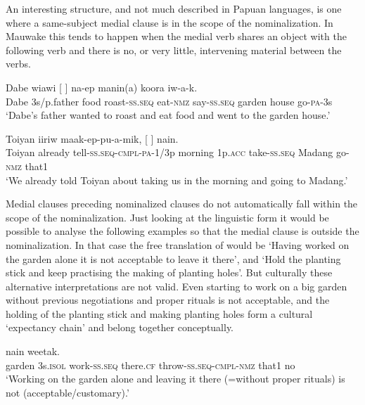 An interesting structure, and not much described in Papuan languages, is one where a same-subject medial clause is in the scope of the nominalization. In Mauwake this tends to happen when the medial verb shares an object with the following verb and there is no, or very little, intervening material between the verbs. 

\ea%
\label{ex:5:x1885}
\gll Dabe  wiawi  [  ]  na-ep manin(a)  koora  iw-a-k. \\
     Dabe  3s/p.father  food  roast-\textsc{ss}.\textsc{seq}  eat-\textsc{nmz}  say-\textsc{ss}.\textsc{seq} garden  house  go-\textsc{pa}-3s \\
\glt `Dabe's father wanted to roast and eat food and went to the garden house.'
\z

\ea%
\label{ex:5:x1845}
\gll Toiyan  iiriw  maak-ep-pu-a-mik,  [     ]  nain. \\
     Toiyan  already  tell-\textsc{ss}.\textsc{seq}-\textsc{cmpl}-\textsc{pa}-1/3p  morning  1p.\textsc{acc} take-\textsc{ss}.\textsc{seq}  Madang  go-\textsc{nmz}  that1 \\
\glt `We already told Toiyan about taking us in the morning and going to Madang.'
\z

Medial clauses preceding nominalized clauses do not automatically fall within the scope of the nominalization. Just looking at the linguistic form it would be possible to analyse the following examples so that the medial clause is outside the nominalization. In that case the free translation of  would be `Having worked on the garden alone it is not acceptable to leave it there', and  `Hold the planting stick and keep practising the making of planting holes'. But culturally these alternative interpretations are not valid. Even starting to work on a big garden without previous negotiations and proper rituals is not acceptable, and the holding of the planting stick and making planting holes form a cultural `expectancy chain' and belong together conceptually.

\ea%
\label{ex:5:x1227}
  nain  weetak. \\
     garden  3s.\textsc{isol}  work-\textsc{ss}.\textsc{seq}  there.\textsc{cf} throw-\textsc{ss}.\textsc{seq}-\textsc{cmpl}-\textsc{nmz}  that1  no \\
\glt `Working on the garden alone and leaving it there (=without proper rituals) is not (acceptable/customary).'
\z

